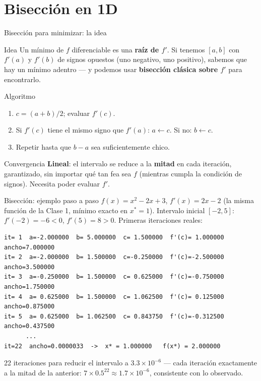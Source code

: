 \documentclass[aspectratio=169,10pt]{beamer}
\begin{document}
\section{Bisección en 1D}

\begin{frame}{Bisección para minimizar: la idea}
  \begin{block}{Idea}
    Un mínimo de $f$ diferenciable es una \textbf{raíz de $f'$}. Si
    tenemos $[a,b]$ con $f'(a)$ y $f'(b)$ de signos opuestos (uno negativo,
    uno positivo), sabemos que hay un mínimo adentro — y podemos usar
    \textbf{bisección clásica sobre $f'$} para encontrarlo.
  \end{block}
  \begin{block}{Algoritmo}
    \begin{enumerate}
      \item $c = (a+b)/2$; evaluar $f'(c)$.
      \item Si $f'(c)$ tiene el mismo signo que $f'(a)$: $a\leftarrow c$.
        Si no: $b\leftarrow c$.
      \item Repetir hasta que $b-a$ sea suficientemente chico.
    \end{enumerate}
  \end{block}
  \begin{alertblock}{Convergencia}
    \textbf{Lineal}: el intervalo se reduce a la \textbf{mitad} en cada
    iteración, garantizado, sin importar qué tan fea sea $f$ (mientras
    cumpla la condición de signos). Necesita poder evaluar $f'$.
  \end{alertblock}
\end{frame}

\begin{frame}[fragile]{Bisección: ejemplo paso a paso}
  $f(x)=x^2-2x+3$, $f'(x)=2x-2$ (la misma función de la Clase 1, mínimo
  exacto en $x^*=1$). Intervalo inicial $[-2,5]$: $f'(-2)=-6<0$,
  $f'(5)=8>0$. Primeras iteraciones reales:
  \tiny
\begin{lstlisting}
it= 1  a=-2.000000  b= 5.000000  c= 1.500000  f'(c)= 1.000000  ancho=7.000000
it= 2  a=-2.000000  b= 1.500000  c=-0.250000  f'(c)=-2.500000  ancho=3.500000
it= 3  a=-0.250000  b= 1.500000  c= 0.625000  f'(c)=-0.750000  ancho=1.750000
it= 4  a= 0.625000  b= 1.500000  c= 1.062500  f'(c)= 0.125000  ancho=0.875000
it= 5  a= 0.625000  b= 1.062500  c= 0.843750  f'(c)=-0.312500  ancho=0.437500
      ...
it=22  ancho=0.0000033  ->  x* = 1.000000   f(x*) = 2.000000
\end{lstlisting}
  \normalsize
  22 iteraciones para reducir el intervalo a $3.3\times10^{-6}$ — cada
  iteración exactamente a la mitad de la anterior: $7\times0.5^{22}\approx
  1.7\times10^{-6}$, consistente con lo observado.
\end{frame}
\end{document}
